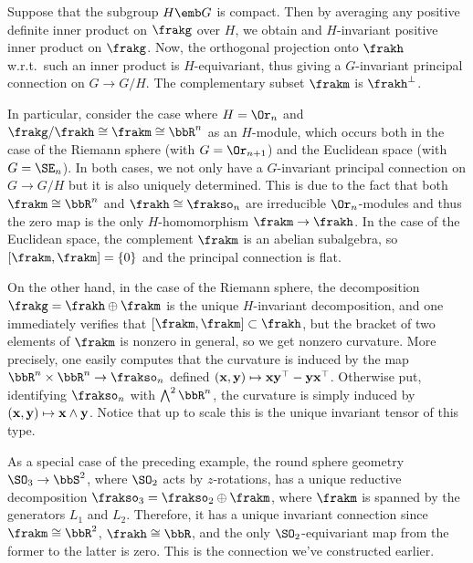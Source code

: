 \begin{example}\label{ex 1.4.6 Cap}
    Suppose that the subgroup $H\emb G$ is compact. Then by averaging any positive definite inner product on $\frakg$ over $H$, we obtain and $H$-invariant positive inner product on $\frakg$. Now, the orthogonal projection onto $\frakh$ w.r.t.\ such an inner product is $H$-equivariant, thus giving a $G$-invariant principal connection on $G\to G\slash H$. The complementary subset $\frakm$ is $\frakh^\perp$.

    In particular, consider the case where $H=\Or_n$ and $\frakg\slash\frakh\cong \frakm\cong \bbR^n$ as an $H$-module, which occurs both in the case of the Riemann sphere (with $G=\Or_{n+1}$) and the Euclidean space (with $G=\SE_n$). In both cases, we not only have a $G$-invariant principal connection on $G\to G\slash H$ but it is also uniquely determined. This is due to the fact that both $\frakm\cong\bbR^n$ and $\frakh\cong \frakso_n$ are irreducible $\Or_n$-modules and thus the zero map is the only $H$-homomorphism $\frakm\to \frakh$. In the case of the Euclidean space, the complement $\frakm$ is an abelian subalgebra, so $[\frakm,\frakm]=\{0\}$ and the principal connection is flat.

    On the other hand, in the case of the Riemann sphere, the decomposition $\frakg=\frakh\oplus\frakm$ is the unique $H$-invariant decomposition, and one immediately verifies that $[\frakm,\frakm]\subset\frakh$, but the bracket of two elements of $\frakm$ is nonzero in general, so we get nonzero curvature. More precisely, one easily computes that the curvature is induced by the map $\bbR^n\times\bbR^n\to \frakso_n$ defined $(\bf{x},\bf{y})\mapsto \bf{x}\bf{y}^\top -\bf{y}\bf{x}^\top $. Otherwise put, identifying $\frakso_n$ with $\bigwedge\nolimits^2\bbR^n$, the curvature is simply induced by $(\bf{x},\bf{y})\mapsto \bf{x}\wedge \bf{y}$. Notice that up to scale this is the unique invariant tensor of this type.
 \end{example}

 \begin{example}\label{ex round sphere 5}
    As a special case of the preceding example, the round sphere geometry $\SO_3\to \bbS^2$, where $\SO_2$ acts by $z$-rotations, has a unique reductive decomposition $\frakso_3=\frakso_2\oplus\frakm$, where $\frakm$ is spanned by the generators $L_1$ and $L_2$. Therefore, it has a unique invariant connection since $\frakm\cong \bbR^2$, $\frakh\cong \bbR$, and the only $\SO_2$-equivariant map from the former to the latter is zero. This is the connection we've constructed earlier.
\end{example}


